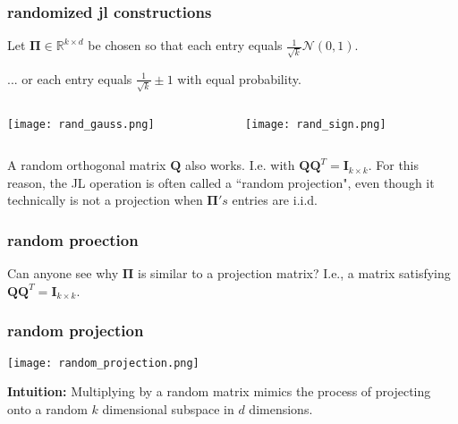 \documentclass[compress]{beamer}
\newcommand{\bs}[1]{\boldsymbol{#1}}
\newcommand{\bv}[1]{\mathbf{#1}}
\newcommand{\R}{\mathbb{R}}
\begin{document}
\begin{frame}
	\frametitle{randomized jl constructions}
	\begin{center}
		Let $\bs{\Pi} \in \R^{k\times d}$ be chosen so that each entry equals $\frac{1}{\sqrt{k}}  \mathcal{N}(0,1)$.
		
		... or each entry equals $\frac{1}{\sqrt{k}}  \pm 1$ with equal probability.
	\end{center}
	\vspace{1em}
	
	\begin{columns}
		\begin{column}{0.5\textwidth}
			\texttt{[image: rand\_gauss.png]}
		\end{column}
		\begin{column}{0.5\textwidth}
			\texttt{[image: rand\_sign.png]}
		\end{column}
	\end{columns}
	
	\begin{center}
		A random orthogonal matrix $\bv{Q}$ also works. I.e. with $\bv{Q}\bv{Q}^T = \bv{I}_{k\times k}$. For this reason, the JL operation is often called a ``random projection", even though it technically is not a projection when $\bs{\Pi}'s$ entries are i.i.d.
	\end{center}
\end{frame}

\begin{frame}[t]
	\frametitle{random proection}
	Can anyone see why $\bs{\Pi}$ is similar to a projection matrix? I.e., a matrix satisfying  $\bv{Q}\bv{Q}^T = \bv{I}_{k\times k}$.
\end{frame}

\begin{frame}
	\frametitle{random projection}
	\begin{center}
		\texttt{[image: random\_projection.png]}
	\end{center}
	\textbf{Intuition:} Multiplying by a random matrix mimics the process of projecting onto a random $k$ dimensional subspace in $d$ dimensions.
\end{frame}
\end{document}
